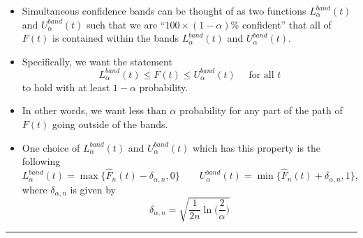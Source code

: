 \documentclass[]{book}
\begin{document}
\begin{itemize}
\item
  Simultaneous confidence bands can be thought of as two functions \(L_{\alpha}^{band}(t)\) and \(U_{\alpha}^{band}(t)\)
  such that we are ``\(100 \times (1 - \alpha)\)\% confident'' that all of \(F(t)\) is contained
  within the bands \(L_{\alpha}^{band}(t)\) and \(U_{\alpha}^{band}(t)\).
\item
  Specifically, we want the statement
  \begin{equation}
  L_{\alpha}^{band}(t) \leq F(t) \leq U_{\alpha}^{band}(t) \quad \textrm{ for all } t
  \end{equation}
  to hold with at least \(1 - \alpha\) probability.
\item
  In other words, we want less than \(\alpha\) probability for any part
  of the path of \(F(t)\) going outside of the bands.
\item
  One choice of \(L_{\alpha}^{band}(t)\) and \(U_{\alpha}^{band}(t)\) which has this property is the following
  \begin{equation}
  L_{\alpha}^{band}(t) = \max\{\hat{F}_{n}(t) - \delta_{\alpha,n}, 0 \} \qquad
  U_{\alpha}^{band}(t) = \min\{\hat{F}_{n}(t) + \delta_{\alpha,n}, 1 \}, 
  \label{eq:simultaneous-cis}
  \end{equation}
  where \(\delta_{\alpha,n}\) is given by
  \begin{equation}
  \delta_{\alpha, n} = \sqrt{\frac{1}{2n} \ln\Big(\frac{2}{\alpha} \Big)} \nonumber
  \end{equation}
\end{itemize}

\begin{center}\rule{0.5\linewidth}{\linethickness}\end{center}
\end{document}
